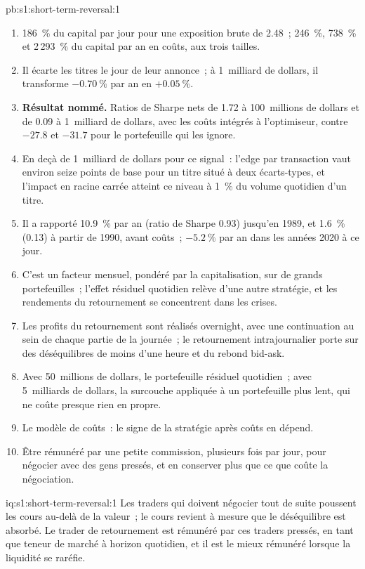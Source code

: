 \begin{solution}{pb:s1:short-term-reversal:1}
\begin{enumerate}
\item 186~\% du capital par jour pour une exposition brute de 2.48~; 246~\%, 738~\% et 2\,293~\% du capital par an en coûts, aux trois tailles.
\item Il écarte les titres le jour de leur annonce~; à 1~milliard de dollars, il transforme $-0.70~\%$ par an en $+0.05~\%$.
\item \textbf{Résultat nommé.} Ratios de Sharpe nets de 1.72 à 100~millions de dollars et de 0.09 à 1~milliard de dollars, avec les coûts intégrés à l'optimiseur, contre $-27.8$ et $-31.7$ pour
le portefeuille qui les ignore.
\item En deçà de 1~milliard de dollars pour ce signal~: l'edge par transaction vaut environ seize points de base pour un titre situé à deux écarts-types, et l'impact en racine carrée atteint
ce niveau à 1~\% du volume quotidien d'un titre.
\item Il a rapporté 10.9~\% par an (ratio de Sharpe 0.93) jusqu'en 1989, et 1.6~\% (0.13) à partir de 1990, avant coûts~; $-5.2~\%$ par an dans les années 2020 à ce jour.
\item C'est un facteur mensuel, pondéré par la capitalisation, sur de grands portefeuilles~; l'effet résiduel quotidien relève d'une autre stratégie, et les rendements du retournement se concentrent dans les crises.
\item Les profits du retournement sont réalisés overnight, avec une continuation au sein de chaque partie de la journée~; le retournement intrajournalier porte sur des déséquilibres de moins d'une heure et du
rebond bid-ask.
\item Avec 50~millions de dollars, le portefeuille résiduel quotidien~; avec 5~milliards de dollars, la surcouche appliquée à un portefeuille plus lent, qui ne coûte presque rien en propre.
\item Le modèle de coûts~: le signe de la stratégie après coûts en dépend.
\item Être rémunéré par une petite commission, plusieurs fois par jour, pour négocier avec des gens pressés, et en conserver plus que ce que coûte la négociation.
\end{enumerate}
\end{solution}

\begin{solution}{iq:s1:short-term-reversal:1}
Les traders qui doivent négocier tout de suite poussent les cours au-delà de la valeur~; le cours revient à mesure que le déséquilibre est absorbé. Le trader de retournement est rémunéré par ces traders pressés,
en tant que teneur de marché à horizon quotidien, et il est le mieux rémunéré lorsque la liquidité se raréfie.
\end{solution}

